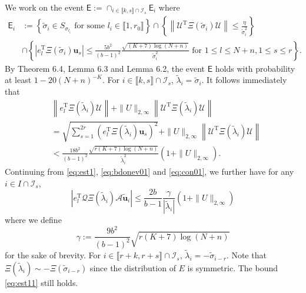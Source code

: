 \documentclass[reqno]{amsart}
\newcommand{\T}{\mathrm{T}}
\theoremstyle{plain}
\theoremstyle{definition}
\begin{document}
We work on the event $\mathsf E:=\cap_{i\in \llbracket k,s \rrbracket\cap \mathcal I_s} \mathsf E_i$ where 
\begin{align}\label{event}
\mathsf E_i&:=\left\{ \widetilde \sigma_i \in S_{\sigma_{l_i}} \text{ for some } l_i \in \llbracket 1,r_0\rrbracket\right\} \cap \left\{ \left\|  \mathcal U^\T  \Xi(\widetilde \sigma_i) \mathcal U \right\| \leq \frac{\eta}{\widetilde \sigma_i^2}\right\} \nonumber\\
&\cap \left\{\left| e_l^\T  \Xi(\widetilde \sigma_i) {\mathbf u}_s  \right| \leq  \frac{5b^2}{(b-1)^2} \frac{\sqrt{(K+7)\log (N+n)}}{\widetilde \sigma_i^2}\text{ for } 1\le l \le N+n, 1\le s \le r \right\}.
\end{align}
By Theorem 6.4, Lemma 6.3 and Lemma 6.2, the event $\mathsf E$ holds with probability at least $1-20(N+n)^{-K}$. For $i\in \llbracket k,s \rrbracket\cap \mathcal I_s$, $\widetilde \lambda_i=\widetilde \sigma_i $. It follows immediately that
\begin{align}\label{eq:bd0208}
&\left\|e_l^\T  \Xi(\widetilde \lambda_i) \mathcal U \right\| + \| U \|_{2,\infty} \left\|\mathcal U^\T \Xi(\widetilde \lambda_i) \mathcal U \right\| \nonumber\\
&= \sqrt{\sum_{s=1}^{2r} \left(e_l^\T  \Xi(\widetilde \lambda_i) \mathbf u_s \right)^2}+ \| U \|_{2,\infty} \left\|\mathcal U^\T \Xi(\widetilde \lambda_i) \mathcal U \right\| \nonumber\\ 
&< \frac{18b^2}{(b-1)^2} \frac{ \sqrt{r(K+7)\log(N+n)}  }{\widetilde \lambda_i^2}(1+ \|  U \|_{2,\infty}) .
\end{align}
Continuing from \eqref{eq:est1}, \eqref{eq:bdonev01} and \eqref{eq:con01}, we further have for any $i\in I\cap \mathcal I_s$,
\begin{equation}\label{eq:est11}
\left| e_l^\T \mathcal Q \Xi(\widetilde \lambda_i) \mathcal A \widetilde{\mathbf u}_i \right| \le  \frac{2b}{b-1}\frac{\gamma }{|\widetilde \lambda_i|}(1+ \| U \|_{2,\infty})
\end{equation}
where we define $$\gamma:= \frac{9 b^2}{(b-1)^2}\sqrt{r(K+7)\log(N+n)} $$ for the sake of brevity.
For $i\in \llbracket r+k, r+s\rrbracket\cap \mathcal I_s$, $\widetilde \lambda_i=-\widetilde \sigma_{i-r} $. Note that $\Xi(\widetilde \lambda_i) \sim -\Xi(\widetilde \sigma_{i-r})$ since the distribution of $E$ is symmetric. The bound \eqref{eq:est11} still holds. 
\end{document}
